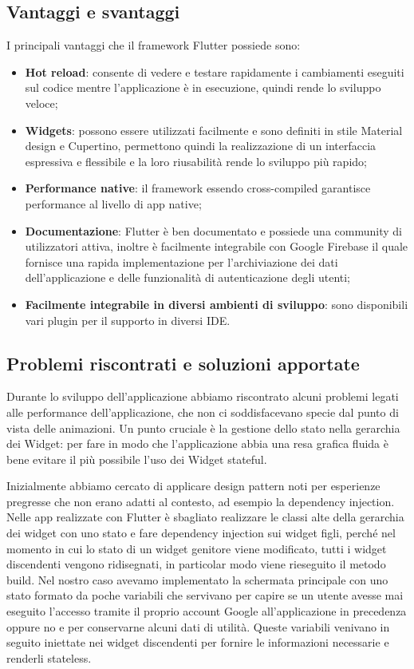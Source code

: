 \subsection{Vantaggi e svantaggi\label{sec:flutter-vantaggi}}
I principali vantaggi che il framework Flutter possiede sono:
\begin{itemize}
	\item \textbf{Hot reload}: consente di vedere e testare rapidamente i cambiamenti eseguiti sul codice mentre l'applicazione è in esecuzione, quindi rende lo sviluppo veloce;
	\item \textbf{Widgets}: possono essere utilizzati facilmente e sono definiti in stile Material design e Cupertino, permettono quindi la realizzazione di un interfaccia espressiva e flessibile e la loro riusabilità rende lo sviluppo più rapido; 
	\item \textbf{Performance native}: il framework essendo cross-compiled garantisce performance al livello di app native;
	\item \textbf{Documentazione}: Flutter è ben documentato e possiede una community di utilizzatori attiva, inoltre è facilmente integrabile con Google Firebase il quale fornisce una rapida implementazione per l'archiviazione dei dati dell'applicazione e delle funzionalità di autenticazione degli utenti;
	\item \textbf{Facilmente integrabile in diversi ambienti di sviluppo}: sono disponibili vari plugin per il supporto in diversi IDE.
\end{itemize}

\subsection{Problemi riscontrati e soluzioni apportate}
Durante lo sviluppo dell'applicazione abbiamo riscontrato alcuni problemi legati alle performance dell'applicazione, che non ci soddisfacevano specie dal punto di vista delle animazioni.
Un punto cruciale è la gestione dello stato nella gerarchia dei Widget: per fare in modo che l'applicazione abbia una resa grafica fluida è bene evitare il più possibile l'uso dei Widget stateful.

Inizialmente abbiamo cercato di applicare design pattern noti per esperienze pregresse che non erano adatti al contesto, ad esempio la dependency injection.
Nelle app realizzate con Flutter è sbagliato realizzare le classi alte della gerarchia dei widget con uno stato e fare dependency injection sui widget figli, perché nel momento in cui lo stato di un widget genitore viene modificato, tutti i widget discendenti vengono ridisegnati, in particolar modo viene rieseguito il metodo build.
Nel nostro caso avevamo implementato la schermata principale con uno stato formato da poche variabili che servivano per capire se un utente avesse mai eseguito l'accesso tramite il proprio account Google all'applicazione in precedenza oppure no e per conservarne alcuni dati di utilità.
Queste variabili venivano in seguito iniettate nei widget discendenti per fornire le informazioni necessarie e renderli stateless.

